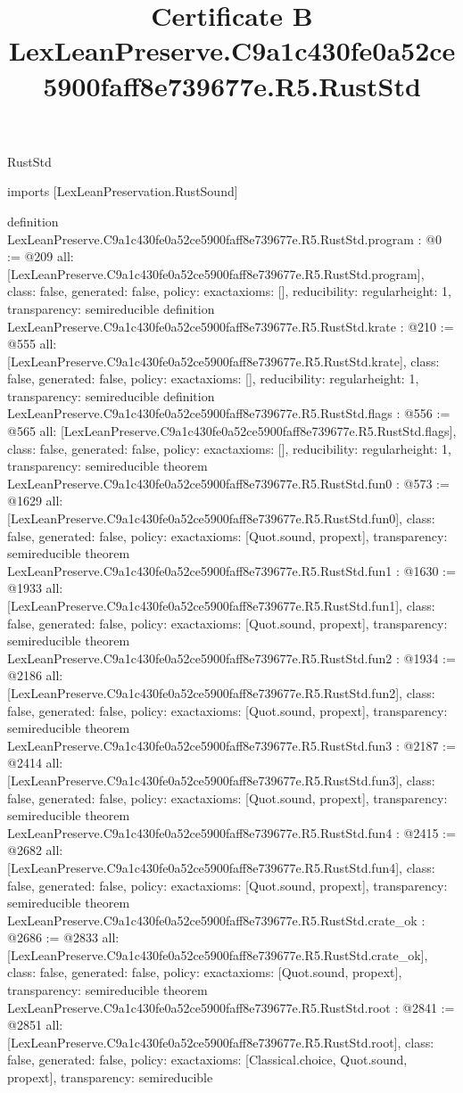 \begin{lexlean}{RustStd}
\title{Certificate B LexLeanPreserve.C9a1c430fe0a52ce5900faff8e739677e.R5.RustStd}
\begin{coremodule}
imports [LexLeanPreservation.RustSound]

definition LexLeanPreserve.C9a1c430fe0a52ce5900faff8e739677e.R5.RustStd.program : @0 := @209 {
  all: [LexLeanPreserve.C9a1c430fe0a52ce5900faff8e739677e.R5.RustStd.program],
  class: false,
  generated: false,
  policy: exact{axioms: []},
  reducibility: regular{height: 1},
  transparency: semireducible
}
definition LexLeanPreserve.C9a1c430fe0a52ce5900faff8e739677e.R5.RustStd.krate : @210 := @555 {
  all: [LexLeanPreserve.C9a1c430fe0a52ce5900faff8e739677e.R5.RustStd.krate],
  class: false,
  generated: false,
  policy: exact{axioms: []},
  reducibility: regular{height: 1},
  transparency: semireducible
}
definition LexLeanPreserve.C9a1c430fe0a52ce5900faff8e739677e.R5.RustStd.flags : @556 := @565 {
  all: [LexLeanPreserve.C9a1c430fe0a52ce5900faff8e739677e.R5.RustStd.flags],
  class: false,
  generated: false,
  policy: exact{axioms: []},
  reducibility: regular{height: 1},
  transparency: semireducible
}
theorem LexLeanPreserve.C9a1c430fe0a52ce5900faff8e739677e.R5.RustStd.fun0 : @573 := @1629 {
  all: [LexLeanPreserve.C9a1c430fe0a52ce5900faff8e739677e.R5.RustStd.fun0],
  class: false,
  generated: false,
  policy: exact{axioms: [Quot.sound, propext]},
  transparency: semireducible
}
theorem LexLeanPreserve.C9a1c430fe0a52ce5900faff8e739677e.R5.RustStd.fun1 : @1630 := @1933 {
  all: [LexLeanPreserve.C9a1c430fe0a52ce5900faff8e739677e.R5.RustStd.fun1],
  class: false,
  generated: false,
  policy: exact{axioms: [Quot.sound, propext]},
  transparency: semireducible
}
theorem LexLeanPreserve.C9a1c430fe0a52ce5900faff8e739677e.R5.RustStd.fun2 : @1934 := @2186 {
  all: [LexLeanPreserve.C9a1c430fe0a52ce5900faff8e739677e.R5.RustStd.fun2],
  class: false,
  generated: false,
  policy: exact{axioms: [Quot.sound, propext]},
  transparency: semireducible
}
theorem LexLeanPreserve.C9a1c430fe0a52ce5900faff8e739677e.R5.RustStd.fun3 : @2187 := @2414 {
  all: [LexLeanPreserve.C9a1c430fe0a52ce5900faff8e739677e.R5.RustStd.fun3],
  class: false,
  generated: false,
  policy: exact{axioms: [Quot.sound, propext]},
  transparency: semireducible
}
theorem LexLeanPreserve.C9a1c430fe0a52ce5900faff8e739677e.R5.RustStd.fun4 : @2415 := @2682 {
  all: [LexLeanPreserve.C9a1c430fe0a52ce5900faff8e739677e.R5.RustStd.fun4],
  class: false,
  generated: false,
  policy: exact{axioms: [Quot.sound, propext]},
  transparency: semireducible
}
theorem LexLeanPreserve.C9a1c430fe0a52ce5900faff8e739677e.R5.RustStd.crate_ok : @2686 := @2833 {
  all: [LexLeanPreserve.C9a1c430fe0a52ce5900faff8e739677e.R5.RustStd.crate_ok],
  class: false,
  generated: false,
  policy: exact{axioms: [Quot.sound, propext]},
  transparency: semireducible
}
theorem LexLeanPreserve.C9a1c430fe0a52ce5900faff8e739677e.R5.RustStd.root : @2841 := @2851 {
  all: [LexLeanPreserve.C9a1c430fe0a52ce5900faff8e739677e.R5.RustStd.root],
  class: false,
  generated: false,
  policy: exact{axioms: [Classical.choice, Quot.sound, propext]},
  transparency: semireducible
}


\end{coremodule}
\end{lexlean}
